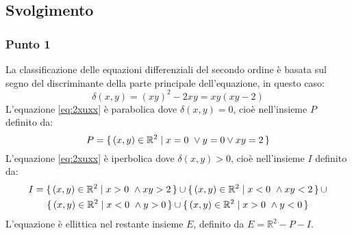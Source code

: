 \documentclass[]{scrartcl}
\begin{document}
\subsection*{Svolgimento}
\subsubsection*{Punto 1}
La classificazione delle equazioni differenziali del secondo ordine è basata sul segno del discriminante della parte principale dell'equazione, in questo caso:
	\begin{equation}
	\delta(x,y) = (xy)^2 - 2x y = xy\left(xy-2\right)
	\label{eq:discriminante}
	\end{equation}
L'equazione \eqref{eq:2xuxx} è parabolica dove $ \delta(x,y) = 0 $, cioè nell'insieme $ P $ definito da:
	\begin{equation}
		P = \set{ (x,y) \in \mathbb{R}^2 | x = 0~ \vee y = 0 \vee xy = 2}  
		\label{eq:parabolica}
	\end{equation}
L'equazione \eqref{eq:2xuxx} è iperbolica dove $ \delta(x,y) > 0 $, cioè nell'insieme $ I $ definito da:
	\begin{multline}
	I = \set{ (x,y) \in \mathbb{R}^2 | x > 0 ~ \wedge xy > 2 }  \cup \set{ (x,y) \in \mathbb{R}^2 | x < 0 ~ \wedge xy < 2 } \cup \\
	\set{ (x,y) \in \mathbb{R}^2 | x < 0 ~ \wedge y > 0 }  \cup \set{ (x,y) \in \mathbb{R}^2 | x > 0 ~ \wedge y < 0 }
	\label{eq:iperbolica}
	\end{multline}
L'equazione è ellittica nel restante insieme $ E $, definito da $ E = \mathbb{R}^2 - P - I$.
\end{document}
